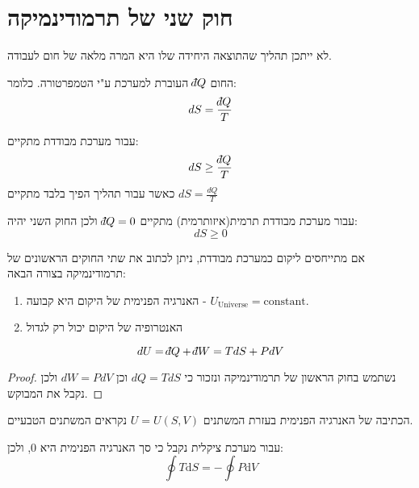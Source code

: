 \documentclass{tstextbook}
\begin{document}
\section{חוק שני של תרמודינמיקה}

\begin{theorem}
לא ייתכן תהליך שהתוצאה היחידה שלו היא המרה מלאה של חום לעבודה.

\end{theorem}
\begin{definition}[אנטרופיה]
החום \(\;\bar{}\mkern-7.5mu dQ\) העוברת למערכת ע"י הטמפרטורה. כלומר:
$$dS = \frac{\;\bar{}\mkern-7.5mu dQ}{T}$$

\end{definition}
\begin{proposition}
עבור מערכת מבודדת מתקיים:
$$dS \geq \frac{\;\bar{}\mkern-7.5mu dQ}{T}$$
כאשר עבור תהליך הפיך בלבד מתקיים \(dS = \frac{dQ}{T}\)

\end{proposition}
\begin{corollary}
עבור מערכת מבודדת תרמית(איזותרמית) מתקיים \(\;\bar{}\mkern-7.5mu dQ=0\) ולכן החוק השני יהיה:
$$dS \geq 0$$

\end{corollary}
\begin{corollary}
אם מתייחסים ליקום כמערכת מבודדת, ניתן לכתוב את שתי החוקים הראשונים של תרמודינמיקה בצורה הבאה:

  \begin{enumerate}
    \item האנרגיה הפנימית של היקום היא קבועה - \(U_{\mathrm{Universe}}=\mathrm{constant}.\)


    \item האנטרופיה של היקום יכול רק לגדול 


  \end{enumerate}
\end{corollary}
\begin{proposition}
$$dU=\;\bar{}\mkern-7.5mu dQ+\;\bar{}\mkern-7.5mu dW=TdS + PdV$$

\end{proposition}
\begin{proof}
נשתמש בחוק הראשון של תרמודינמיקה ונזכור כי \(dQ = TdS\) וכן \(dW = PdV\) ולכן נקבל את המבוקש.

\end{proof}
\begin{remark}
הכתיבה של האנרגיה הפנימית בעזרת המשתנים \(U=U(S,V)\) נקראים המשתנים הטבעיים. 

\end{remark}
\begin{proposition}
עבור מערכת ציקלית נקבל כי סך האנרגיה הפנימית היא 0, ולכן:
$$\oint T\mathrm{d}S = - \oint P \mathrm{d}V$$

\end{proposition}
\end{document}

